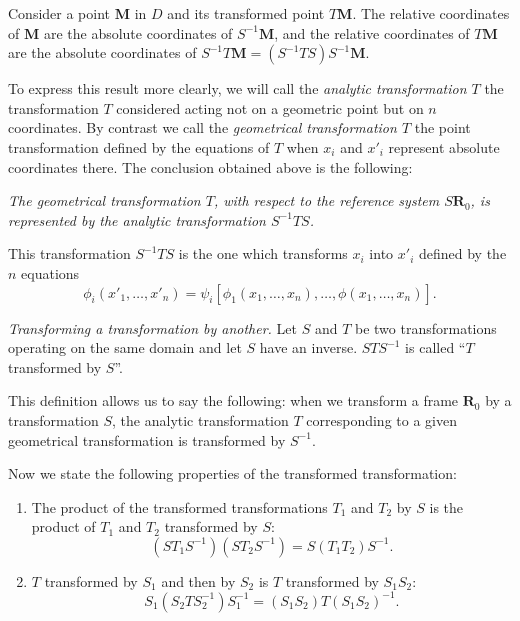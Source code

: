 Consider a point $\mathbf{M}$ in $D$ and its transformed point $T\mathbf{M}$. The relative coordinates of $\mathbf{M}$ are the absolute coordinates of $S^{-1}\mathbf{M}$, and the relative coordinates of $T\mathbf{M}$ are the absolute coordinates of $S^{-1}T\mathbf{M}=(S^{-1}TS)S^{-1}\mathbf{M}$.

To express this result more clearly, we will call the \emph{analytic transformation $T$} the transformation $T$ considered acting not on a geometric point but on $n$ coordinates. By contrast we call the \emph{geometrical transformation $T$} the point transformation defined by the equations of $T$ when $x_{i}$ and $x'_{i}$ represent absolute coordinates there. The conclusion obtained above is the following:

\somespace

\emph{The geometrical transformation $T$, with respect to the reference system $S\mathbf{R}_{0}$, is represented by the analytic transformation $S^{-1}TS$.}

\somespace

This transformation $S^{-1}TS$ is the one which transforms $x_{i}$ into $x'_{i}$ defined by the $n$ equations
\begin{equation}
  \label{eq:5.3}
  \phi_{i}(x'_{1},\dots,x'_{n})=\psi_{i}[\phi_{1}(x_{1},\dots,x_{n}),\dots,\phi(x_{1},\dots,x_{n})].
\end{equation}

\somespace

\emph{Transforming a transformation by another.} Let $S$ and $T$ be two transformations operating on the same domain and let $S$ have an inverse. $STS^{-1}$ is called ``$T$ transformed by $S$''.

This definition allows us to say the following: when we transform a frame $\mathbf{R}_{0}$ by a transformation $S$, the analytic transformation $T$ corresponding to a given geometrical transformation is transformed by $S^{-1}$.

Now we state the following properties of the transformed transformation:
\begin{enumerate}[\itshape a.]
\item The product of the transformed transformations $T_{1}$ and $T_{2}$ by $S$ is the product of $T_{1}$ and $T_{2}$ transformed by $S$:
\[
(ST_{1}S^{-1})(ST_{2}S^{-1})=S(T_{1}T_{2})S^{-1}.
\]
\item $T$ transformed by $S_{1}$ and then by $S_{2}$ is $T$ transformed by $S_{1}S_{2}$:
\[
S_{1}(S_{2}TS_{2}^{-1})S_{1}^{-1}=(S_{1}S_{2})T(S_{1}S_{2})^{-1}.
\]
\end{enumerate}

